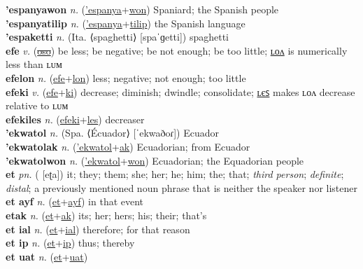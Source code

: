 \textbf{'espanyawon} \textit{n.} (\hyperref['espanya]{'espanya}+\hyperref[won]{won})
Spaniard; the Spanish people \label{'espanyawon} \\
\textbf{'espanyatilip} \textit{n.} (\hyperref['espanya]{'espanya}+\hyperref[tilip]{tilip})
the Spanish language \label{'espanyatilip} \\
\textbf{'espaketti} \textit{n.} (Ita. ⟨spaghetti⟩ [spaˈɡetti])
spaghetti \label{'espaketti} \\
\textbf{efe} \textit{v.} (\hyperref[oso]{\sout{oso}})
be less; be negative; be not enough; be too little; \hyperref[efelon]{ʟᴏᴧ} is numerically less than ʟᴜᴍ \label{efe} \\
\textbf{efelon} \textit{n.} (\hyperref[efe]{efe}+\hyperref[lon]{lon})
less; negative; not enough; too little \label{efelon} \\
\textbf{efeki} \textit{v.} (\hyperref[efe]{efe}+\hyperref[ki]{ki})
decrease; diminish; dwindle; consolidate; \hyperref[efekiles]{ʟєꜱ} makes ʟᴏᴧ decrease relative to ʟᴜᴍ \label{efeki} \\
\textbf{efekiles} \textit{n.} (\hyperref[efeki]{efeki}+\hyperref[les]{les})
decreaser \label{efekiles} \\
\textbf{'ekwatol} \textit{n.} (Spa. ⟨Écuador⟩ [ˈekwaðoɾ])
Ecuador \label{'ekwatol} \\
\textbf{'ekwatolak} \textit{n.} (\hyperref['ekwatol]{'ekwatol}+\hyperref[ak]{ak})
Ecuadorian; from Ecuador \label{'ekwatolak} \\
\textbf{'ekwatolwon} \textit{n.} (\hyperref['ekwatol]{'ekwatol}+\hyperref[won]{won})
Ecuadorian; the Equadorian people \label{'ekwatolwon} \\
\textbf{et} \textit{pn.} ( [eʈa])
it; they; them; she; her; he; him; the; that; \textit{third person}; \textit{definite}; \textit{distal}; a previously mentioned noun phrase that is neither the speaker nor listener \label{et} \\
\textbf{et ayf} \textit{n.} (\hyperref[et]{et}+\hyperref[ayf]{ayf})
in that event \label{et ayf} \\
\textbf{etak} \textit{n.} (\hyperref[et]{et}+\hyperref[ak]{ak})
its; her; hers; his; their; that’s \label{etak} \\
\textbf{et ial} \textit{n.} (\hyperref[et]{et}+\hyperref[ial]{ial})
therefore; for that reason \label{et ial} \\
\textbf{et ip} \textit{n.} (\hyperref[et]{et}+\hyperref[ip]{ip})
thus; thereby \label{et ip} \\
\textbf{et uat} \textit{n.} (\hyperref[et]{et}+\hyperref[uat]{uat})
